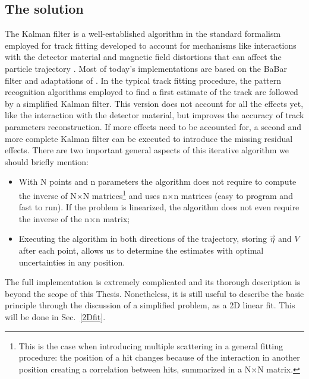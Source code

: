 \begin{refsection}
\section{The solution}
    The Kalman filter is a well-established algorithm in the standard formalism employed for track fitting developed to account for mechanisms like interactions with the detector material and magnetic field distortions that can affect the particle trajectory \cite{Kalman:1984}\cite{Kalman:1987}. 
    Most of today's implementations are based on the BaBar filter and adaptations of \cite{Kalman}\cite{Kalman:1987}.
    In the typical track fitting procedure, the pattern recognition algorithms employed to find a first estimate of the track are followed by a simplified Kalman filter. 
    This version does not account for all the effects yet, like the interaction with the detector material, but improves the accuracy of track parameters reconstruction. 
    If more effects need to be accounted for, a second and more complete Kalman filter can be executed to introduce the missing residual effects. 
    There are two important general aspects of this iterative algorithm we should briefly mention: 
    \begin{itemize}
        \item With N points and n parameters the algorithm does not require to compute the inverse of N$\times$N matrices\footnote{This is the case when introducing multiple scattering in a general fitting procedure: the position of a hit changes because of the interaction in another position creating a correlation between hits, summarized in a N$\times$N matrix.} and uses n$\times$n matrices (easy to program and fast to run).
        If the problem is linearized, the algorithm does not even require the inverse of the n$\times$n matrix;
        \item Executing the algorithm in both directions of the trajectory, storing $\vec{\eta}$ and $V$ after each point, allows us to determine the estimates with optimal uncertainties in any position.
    \end{itemize} 
    The full implementation is extremely complicated and its thorough description is beyond the scope of this Thesis. 
    Nonetheless, it is still useful to describe the basic principle through the discussion of a simplified problem, as a 2D linear fit. 
    This will be done in Sec.~\ref{2Dfit}.


\end{refsection}
